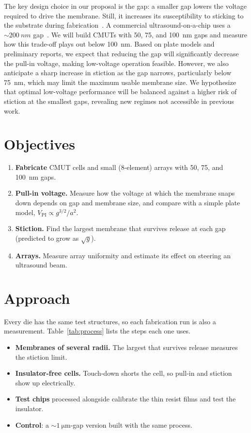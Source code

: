 \documentclass[9pt]{extarticle}
\newcommand{\VPI}{V_{\mathrm{PI}}}
\begin{document}
The key design choice in our proposal is the gap: a smaller gap lowers the voltage required to drive the membrane. Still, it increases its susceptibility to sticking to the substrate during fabrication~\cite{brenner2019,gerardo2018}. A commercial ultrasound-on-a-chip uses a ${\sim}\SI{200}{nm}$ gap~\cite{rothberg2021}. We will build CMUTs with 50, 75, and \SI{100}{nm} gaps and measure how this trade-off plays out below \SI{100}{nm}. Based on plate models and preliminary reports, we expect that reducing the gap will significantly decrease the pull-in voltage, making low-voltage operation feasible. However, we also anticipate a sharp increase in stiction as the gap narrows, particularly below \SI{75}{nm}, which may limit the maximum usable membrane size. We hypothesize that optimal low-voltage performance will be balanced against a higher risk of stiction at the smallest gaps, revealing new regimes not accessible in previous work.

\section{Objectives}

\begin{enumerate}[label=\textbf{O\arabic*}, leftmargin=2.2em]
  \item \textbf{Fabricate} CMUT cells and small (8-element) arrays with 50, 75, and \SI{100}{nm} gaps.
  \item \textbf{Pull-in voltage.} Measure how the voltage at which the membrane snaps down depends on gap and membrane size, and compare with a simple plate model, $\VPI \propto g^{3/2}/a^{2}$.
  \item \textbf{Stiction.} Find the largest membrane that survives release at each gap (predicted to grow as $\sqrt{g}$).
  \item \textbf{Arrays.} Measure array uniformity and estimate its effect on steering an ultrasound beam.
\end{enumerate}

\section{Approach}

Every die has the same test structures, so each fabrication run is also a measurement. Table~\ref{tab:process} lists the steps each one uses.
\begin{itemize}
  \item \textbf{Membranes of several radii.} The largest that survives release measures the stiction limit.
  \item \textbf{Insulator-free cells.} Touch-down shorts the cell, so pull-in and stiction show up electrically.
  \item \textbf{Test chips} processed alongside calibrate the thin resist films and test the insulator.
  \item \textbf{Control}: a ${\sim}\SI{1}{\micro\meter}$-gap version built with the same process.
\end{itemize}
\end{document}
